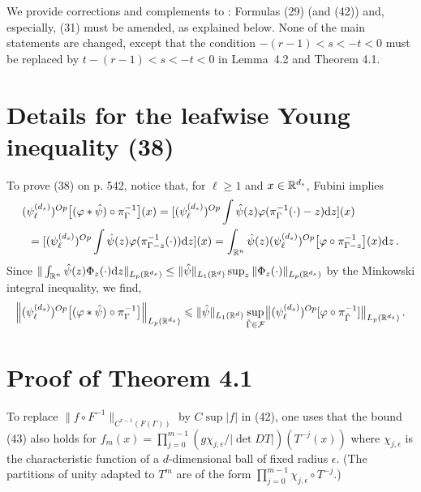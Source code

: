 \documentclass[10pt,twoside]{amsart}
\begin{document}
%
\vspace*{-0.6cm}

We provide corrections and complements to  \cite[\S4]{Baladijoel}: Formulas (29) (and (42))
and, especially,  (31) must be amended, as explained below.
None of the main statements
are changed, except that the condition $-(r-1)<s<-t<0$
 must be replaced by  $t-(r-1)<s<-t<0$ in Lemma~4.2
and  Theorem 4.1. 


\section{Details for the leafwise Young inequality (38)}

To prove (38) on p. 542, notice that, for  $\ell\ge 1$ and $x\in \mathbb{R}^{d_s}$,
Fubini implies
\begin{align*}
&(\psi_\ell^{(d_s)})^{Op}\bigl[(\varphi \ast \hat \psi) \circ \pi_{\Gamma}^{-1}\bigr] (x) = 
[(\psi_\ell^{(d_s)})^{Op}\int \hat \psi (z) \varphi  (\pi_{\Gamma}^{-1}(\cdot)-z)  \mathrm{d} z ](x)\\
&\, \,\, = 
[(\psi_\ell^{(d_s)})^{Op}\int \hat \psi (z) \varphi  (\pi_{\Gamma-z}^{-1}(\cdot))   \mathrm{d} z ](x)=
\int_{\mathbb{R}^n}\hat \psi(z) (\psi_\ell^{(d_s)})^{Op} 
\bigl[\varphi \circ \pi_{\Gamma -z}^{-1} \bigr] ( x ) \mathrm{d}z\, .
\end{align*}
Since $\| \int_{\mathbb{R}^n} \hat \psi(z) \Phi_z(\cdot) \mathrm{d} z \|_{L_p(\mathbb{R}^{d_s})}
\le \|\hat \psi\|_{L_1(\mathbb{R}^d)} \sup_z \| \Phi_z(\cdot)\|_{L_p(\mathbb{R}^{d_s})}$ by the Minkowski integral inequality,
we find,
\begin{equation*}
\left\| (\psi_\ell^{(d_s)})^{Op}\bigl[(\varphi \ast \hat \psi) \circ \pi_{\Gamma}^{-1}\bigr] \right\|_{L_p(\mathbb{R}^{d_s})} 
\leqslant \|\hat \psi\|_{L_1(\mathbb{R}^d)} 
\sup_{\tilde{\Gamma} \in \mathcal{F} } 
\bigl\| (\psi_\ell^{(d_s)})^{Op} [\varphi \circ \pi_{\tilde{\Gamma}}^{-1} ] \bigr\|_{L_p(\mathbb{R}^{d_s})} \, .
\end{equation*} 

\section{Proof of Theorem 4.1}

To replace $\|f \circ F^{-1}\|_{C^{r-1}(F(\Gamma))}$
by $C\sup|f|$ in (42), one uses that the bound (43) also holds for 
$f_m(x)=\prod_{j=0}^{m-1} (g \chi_{j,\epsilon} / |\det DT|) (T^{-j}(x))
$
where $\chi_{j,\epsilon}$ is the characteristic function of a $d$-dimensional ball 
of fixed radius $\epsilon$. (The partitions of unity adapted to $T^m$ are of the
form $\prod_{j=0}^{m-1} \chi_{j,\epsilon} \circ T^{-j}$.)
\end{document}
